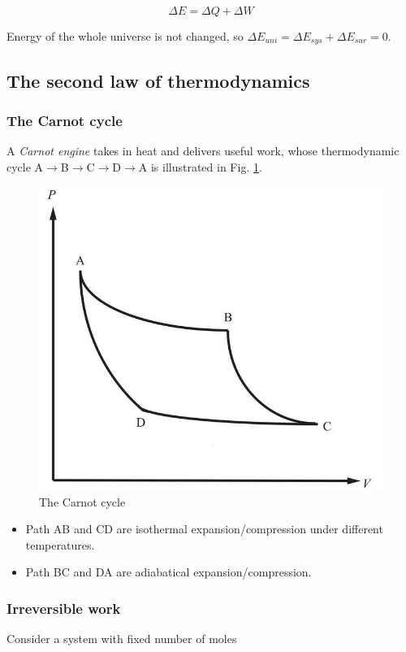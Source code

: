\begin{equation}
	\Delta E=\Delta Q+\Delta W
\end{equation}

Energy of the whole universe is not changed, so $\Delta E_{uni}=\Delta E_{sys}+\Delta E_{sur}=0$.

\subsection{The second law of thermodynamics}

\subsubsection{The Carnot cycle}

A \textit{Carnot engine} takes in heat and delivers useful work, whose thermodynamic cycle A$\to$B$\to$C$\to$D$\to$A is illustrated in Fig. \ref{fig:2.3-carnot}. 

\begin{figure}[!h]
	\centering
	\includegraphics[width=0.6\linewidth]{figure/2.3-carnot}
	\caption{The Carnot cycle}
	\label{fig:2.3-carnot}
\end{figure}

\begin{itemize}
	\item Path AB and CD are isothermal expansion/compression under different temperatures.
	\item Path BC and DA are adiabatical expansion/compression.
\end{itemize}

\subsubsection{Irreversible work}

Consider a system with fixed number of moles

